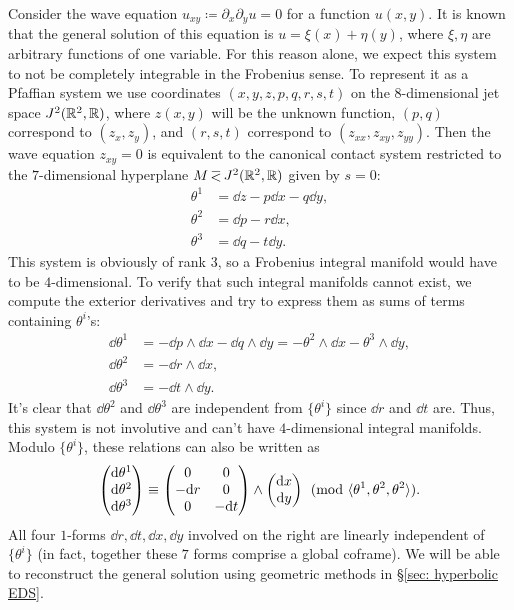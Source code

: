 \begin{example}
    Consider the wave equation $u_{xy}\coloneqq \partial_x\partial_yu=0$ for a function $u(x,y)$. It is known that the general solution of this equation is $u=\xi(x)+\eta(y)$, where $\xi,\eta$ are arbitrary functions of one variable. For this reason alone, we expect this system to not be completely integrable in the Frobenius sense. To represent it as a Pfaffian system we use coordinates $(x,y,z,p,q,r,s,t)$ on the $8$-dimensional jet space $J^2(\mathbb{R}^2,\mathbb{R})$, where $z(x,y)$ will be the unknown function, $(p,q)$ correspond to $(z_x,z_y)$, and $(r,s,t)$ correspond to $(z_{xx},z_{xy},z_{yy})$. Then the wave equation $z_{xy}=0$ is equivalent to the canonical contact system restricted to the $7$-dimensional hyperplane $M\emb J^2(\bbR^2,\bbR)$ given by $s=0$:
    \begin{align}
        \theta^1&= \dd z-p\dd x-q\dd y,\\
        \theta^2&= \dd p- r\dd x,\\
        \theta^3&= \dd q- t\dd y.
    \end{align}
    This system is obviously of rank $3$, so a Frobenius integral manifold would have to be $4$-dimensional. To verify that such integral manifolds cannot exist, we compute the exterior derivatives and try to express them as sums of terms containing $\theta^i$'s:
    \begin{align}
        \dd\theta^1&=-\dd p\wedge \dd x-\dd q\wedge\dd y=-\theta^2\wedge\dd x-\theta^3\wedge \dd y,\\
        \dd\theta^2&=-\dd r\wedge\dd x,\\
        \dd\theta^3&=-\dd t\wedge \dd y.
    \end{align}
    It's clear that $\dd\theta^2$ and $\dd\theta^3$ are independent from $\{\theta^i\}$ since $\dd r$ and $\dd t$ are. Thus, this system is not involutive and can't have $4$-dimensional integral manifolds. Modulo $\{\theta^i\}$, these relations can also be written as 
    \[
        \begin{pmatrix}
            {\mathrm{d}}\theta^1\\
            {\mathrm{d}}\theta^2\\
            {\mathrm{d}}\theta^3
        \end{pmatrix}\equiv
        \begin{pmatrix}
            0 & 0 \\
            -{\mathrm{d}} r & 0\\
            0 & -{\mathrm{d}} t
        \end{pmatrix}\wedge
        \begin{pmatrix}
            {\mathrm{d}} x\\
            {\mathrm{d}} y
        \end{pmatrix} \pmod{\langle\theta^1,\theta^2,\theta^2\rangle}.
    \]
    All four $1$-forms $\dd r,\dd t,\dd x,\dd y$ involved on the right are linearly independent of $\{\theta^i\}$ (in fact, together these $7$ forms comprise a global coframe). We will be able to reconstruct the general solution using geometric methods in \S\ref{sec: hyperbolic EDS}.
\end{example}


